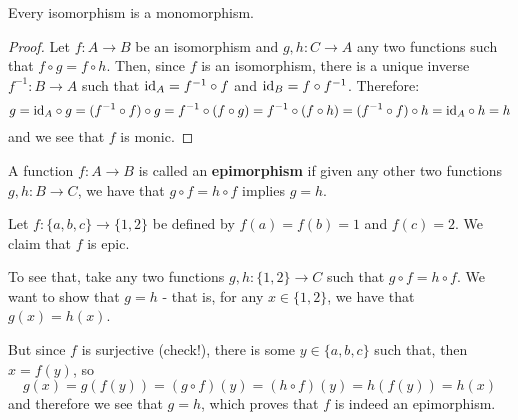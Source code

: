 \begin{lemma}\label{lem:iso is mono}
	Every isomorphism is a monomorphism.
\end{lemma}
\begin{proof}
	Let $f:A\to B$ be an isomorphism and $g,h:C\to A$ any two functions such that $f\circ g=f\circ h$. Then, since $f$ is an isomorphism, there is a unique inverse $f^{-1}:B\to A$ such that ${\rm id}_A=f^{-1}\circ f$ and ${\rm id}_B=f\circ f^{-1}$. Therefore:
	\[g={\rm id}_A\circ g=(f^{-1}\circ f)\circ g=f^{-1}\circ (f\circ g)=f^{-1}\circ (f\circ h)=(f^{-1}\circ f)\circ h={\rm id}_A\circ h=h\]and we see that $f$ is monic.
\end{proof}

\begin{df}
	A function $f:A\to B$ is called an \textbf{epimorphism} if given any other two functions $g,h:B\to C$, we have that $g\circ f=h\circ f$ implies $g=h$.
\end{df}

\begin{ex}
	Let $f:\{a,b,c\}\to\{1,2\}$ be defined by $f(a)=f(b)=1$ and $f(c)=2$. We claim that $f$ is epic.
	
	To see that, take any two functions $g,h:\{1,2\}\to C$ such that $g\circ f=h\circ f$. We want to show that $g=h$ - that is, for any $x\in\{1,2\}$, we have that $g(x)=h(x)$.
	
	But since $f$ is surjective (check!), there is some $y\in\{a,b,c\}$ such that, then $x=f(y)$, so
	\[g(x)=g(f(y))=(g\circ f)(y)=(h\circ f)(y)=h(f(y))=h(x)\]and therefore we see that $g=h$, which proves that $f$ is indeed an epimorphism.
\end{ex}

